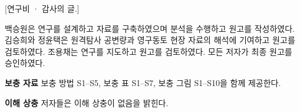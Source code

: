 \ifnum{}
[연구비 · 감사의 글.]

백승원은 연구를 설계하고 자료를 구축하였으며 분석을 수행하고 원고를 작성하였다. 김승희와 정윤택은 원격탐사 공변량과 영구동토 현장 자료의 해석에 기여하고 원고를 검토하였다. 조용채는 연구를 지도하고 원고를 검토하였다. 모든 저자가 최종 원고를 승인하였다.

\textbf{보충 자료} 보충 방법 S1--S5, 보충 표 S1--S7, 보충 그림 S1--S10을 함께 제공한다.

\textbf{이해 상충} 저자들은 이해 상충이 없음을 밝힌다.
\fi
